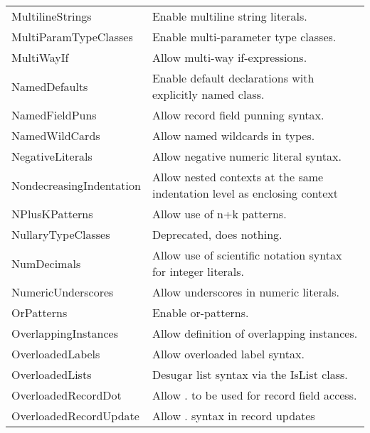 \documentclass[openany, 12pt]{book}
\begin{document}
\begin{center}
\begin{supertabular}{ll}
		MultilineStrings           & Enable multiline string literals.                                          \\
		MultiParamTypeClasses      & Enable multi-parameter type classes.                                       \\
		MultiWayIf                 & Allow multi-way if-expressions.                                            \\
		NamedDefaults              & Enable default declarations with explicitly named class.                   \\
		NamedFieldPuns             & Allow record field punning syntax.                                         \\
		NamedWildCards             & Allow named wildcards in types.                                            \\
		NegativeLiterals           & Allow negative numeric literal syntax.                                     \\
		NondecreasingIndentation   & Allow nested contexts at the same indentation level as enclosing context   \\
		NPlusKPatterns             & Allow use of n+k patterns.                                                 \\
		NullaryTypeClasses         & Deprecated, does nothing.                                                  \\
		NumDecimals                & Allow use of scientific notation syntax for integer literals.              \\
		NumericUnderscores         & Allow underscores in numeric literals.                                     \\
		OrPatterns                 & Enable or-patterns.                                                        \\
		OverlappingInstances       & Allow definition of overlapping instances.                                 \\
		OverloadedLabels           & Allow overloaded label syntax.                                             \\
		OverloadedLists            & Desugar list syntax via the IsList class.                                  \\
		OverloadedRecordDot        & Allow . to be used for record field access.                                \\
		OverloadedRecordUpdate     & Allow . syntax in record updates                                           \\

\end{supertabular}
\end{center}
\end{document}
